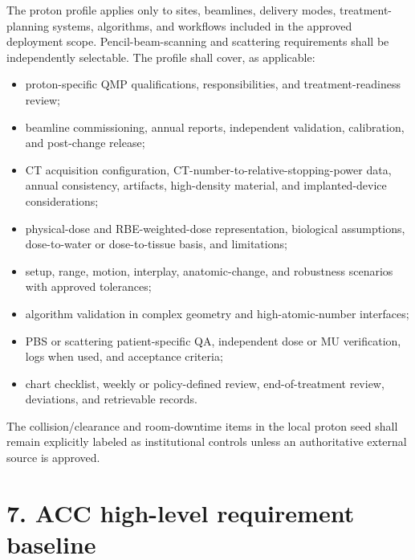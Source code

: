 \documentclass[11pt,letterpaper]{article}
\begin{document}
The proton profile applies only to sites, beamlines, delivery modes, treatment-planning systems, algorithms, and workflows included in the approved deployment scope. Pencil-beam-scanning and scattering requirements shall be independently selectable. The profile shall cover, as applicable:

\begin{itemize}
\item proton-specific QMP qualifications, responsibilities, and treatment-readiness review;
\item beamline commissioning, annual reports, independent validation, calibration, and post-change release;
\item CT acquisition configuration, CT-number-to-relative-stopping-power data, annual consistency, artifacts, high-density material, and implanted-device considerations;
\item physical-dose and RBE-weighted-dose representation, biological assumptions, dose-to-water or dose-to-tissue basis, and limitations;
\item setup, range, motion, interplay, anatomic-change, and robustness scenarios with approved tolerances;
\item algorithm validation in complex geometry and high-atomic-number interfaces;
\item PBS or scattering patient-specific QA, independent dose or MU verification, logs when used, and acceptance criteria;
\item chart checklist, weekly or policy-defined review, end-of-treatment review, deviations, and retrievable records.
\end{itemize}

The collision/clearance and room-downtime items in the local proton seed shall remain explicitly labeled as institutional controls unless an authoritative external source is approved.

\section{7. ACC high-level requirement baseline}
\end{document}
